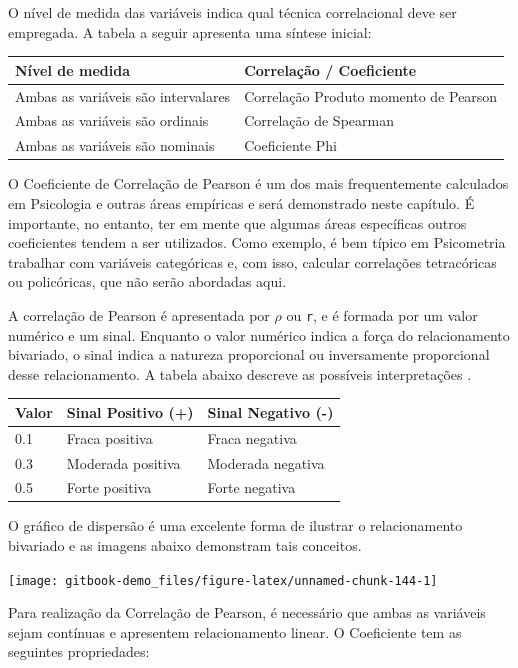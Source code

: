 \documentclass[
]{book}
\begin{document}
O nível de medida das variáveis indica qual técnica correlacional deve ser empregada. A tabela a seguir apresenta uma síntese inicial:

\begin{longtable}[]{@{}ll@{}}
\toprule
Nível de medida & Correlação / Coeficiente \\
\midrule
\endhead
Ambas as variáveis são intervalares & Correlação Produto momento de Pearson \\
Ambas as variáveis são ordinais & Correlação de Spearman \\
Ambas as variáveis são nominais & Coeficiente Phi \\
\bottomrule
\end{longtable}

O Coeficiente de Correlação de Pearson é um dos mais frequentemente calculados em Psicologia e outras áreas empíricas e será demonstrado neste capítulo. É importante, no entanto, ter em mente que algumas áreas específicas outros coeficientes tendem a ser utilizados. Como exemplo, é bem típico em Psicometria trabalhar com variáveis categóricas e, com isso, calcular correlações tetracóricas ou policóricas, que não serão abordadas aqui.

A correlação de Pearson é apresentada por \(\rho\) ou \texttt{r}, e é formada por um valor numérico e um sinal. Enquanto o valor numérico indica a força do relacionamento bivariado, o sinal indica a natureza proporcional ou inversamente proporcional desse relacionamento. A tabela abaixo descreve as possíveis interpretações \citep{Cohen1988}.

\begin{longtable}[]{@{}lll@{}}
\toprule
Valor & Sinal Positivo (+) & Sinal Negativo (-) \\
\midrule
\endhead
0.1 & Fraca positiva & Fraca negativa \\
0.3 & Moderada positiva & Moderada negativa \\
0.5 & Forte positiva & Forte negativa \\
\bottomrule
\end{longtable}

O gráfico de dispersão é uma excelente forma de ilustrar o relacionamento bivariado e as imagens abaixo demonstram tais conceitos.

\begin{center}\texttt{[image: gitbook-demo\_files/figure-latex/unnamed-chunk-144-1]} \end{center}

Para realização da Correlação de Pearson, é necessário que ambas as variáveis sejam contínuas e apresentem relacionamento linear. O Coeficiente tem as seguintes propriedades:
\end{document}
